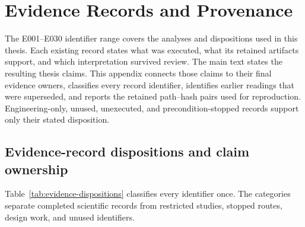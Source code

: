 \section{Evidence Records and Provenance}
\label{app:evidence-provenance}

The E001--E030 identifier range covers the analyses and dispositions used in this thesis.
Each existing record states what was executed, what its retained artifacts support, and which interpretation survived review.
The main text states the resulting thesis claims.
This appendix connects those claims to their final evidence owners, classifies every record identifier, identifies earlier readings that were superseded, and reports the retained path--hash pairs used for reproduction.
Engineering-only, unused, unexecuted, and precondition-stopped records support only their stated disposition.

\subsection{Evidence-record dispositions and claim ownership}
\label{app:evidence-ledger}

Table~\ref{tab:evidence-dispositions} classifies every identifier once.
The categories separate completed scientific records from restricted studies, stopped routes, design work, and unused identifiers.

